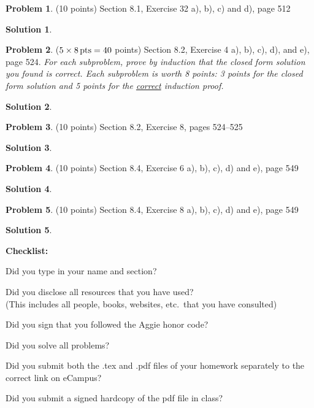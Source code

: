 \documentclass{article}
\theoremstyle{definition}
\newtheorem{problem}{Problem}
\newtheorem*{solution}{Solution}
\newcommand{\checklist}{\noindent\textbf{Checklist:}
\begin{compactitem}[$\Box$] 
\item Did you type in your name and section? 
\item Did you disclose all resources that you have used? \\
(This includes all people, books, websites, etc.\ that you have consulted)
\item Did you sign that you followed the Aggie honor code? 
\item Did you solve all problems? 
\item Did you submit both the .tex and .pdf files of your homework separately 
to the correct link on eCampus?
\item Did you submit a signed hardcopy of the pdf file in class? 
\end{compactitem}
}
\begin{document}
\begin{problem} (10 points)
Section 8.1, Exercise 32 a), b), c) and d), page 512
\end{problem}
\begin{solution} 
\end{solution}

\begin{problem} ($5\times 8 \mbox{\,pts} = 40$ points)
Section 8.2, Exercise 4 a), b), c), d), and e), page 524.  
\textsl{For each subproblem, prove by induction that the closed form solution 
you found is correct.  Each subproblem is worth 8 points: 3 points for the closed 
form solution and 5 points for the \underline{correct} induction proof.}
\end{problem}
\begin{solution} 
\end{solution}

\begin{problem} (10 points)
Section 8.2, Exercise 8, pages 524--525
\end{problem}
\begin{solution} 
\end{solution}


\begin{problem} (10 points)
Section 8.4, Exercise 6 a), b), c), d) and e), page 549
\end{problem}
\begin{solution} 
\end{solution}

\begin{problem} (10 points)
Section 8.4, Exercise 8 a), b), c), d) and e), page 549
\end{problem}
\begin{solution} 
\end{solution}

\goodbreak
\checklist
\end{document}
